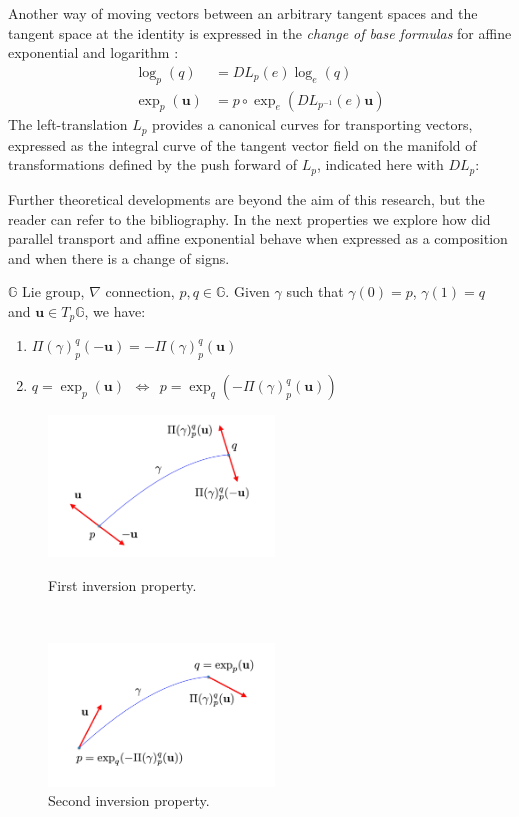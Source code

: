 Another way of moving vectors between an arbitrary tangent spaces and the tangent space at the identity is expressed in the \emph{change of base formulas} for affine exponential and logarithm \cite{arsigny2006bi}:
\begin{align}\label{eq:DL_DR}
\log _{p}(q)  &= DL_{p}(e) \log _{e}(q)  \\
\exp _{p}(\mathbf{u})  &= p\circ \exp_{e} (DL_{p^{-1}}(e) \mathbf{u})
\end{align}
The left-translation $L_{p}$ provides a canonical curves for transporting vectors, expressed as the integral curve of the tangent vector field on the manifold of transformations defined by the push forward of $L_{p}$, indicated here with $DL_{p}$:

Further theoretical developments are beyond the aim of this research, but the reader can refer to the bibliography.
In the next properties we explore how did parallel transport and affine exponential behave when expressed as a composition and when there is a change of signs.
\begin{prop}[Inversion]
	$\mathbb{G}$ Lie group, $\nabla$ connection, $p,q\in\mathbb{G}$. Given $\gamma$ such that $\gamma(0)= p$, $\gamma(1)=q$ and $\mathbf{u}\in T_{p}\mathbb{G}$, we have:
	\begin{enumerate}
	\item $\Pi(\gamma)_{p}^{q}(-\mathbf{u}) = -\Pi(\gamma)_{p}^{q}(\mathbf{u})$
	\item $q = \exp_{p}(\mathbf{u}) \phantom{z} \Longleftrightarrow \phantom{z} p = \exp_{q}(-\Pi(\gamma)_{p}^{q}(\mathbf{u}))$
	\end{enumerate}
\end{prop}

\begin{figure}[htbp]
	\centering
	\begin{minipage}[b]{3cm}
		\hspace{-4cm}
		\centering
		\includegraphics[width=6cm]{figures/inversion_1.pdf}
		\caption{First inversion property.}
		\label{fig:inversion_propr1}
	\end{minipage}
	\ \hspace{9mm} \
	\begin{minipage}[b]{4cm}
		\centering
		\includegraphics[width=6cm]{figures/inversion_2.pdf}
		\caption{Second inversion property.}
		\label{fig:inversion_propr2}
	\end{minipage}
\end{figure}

